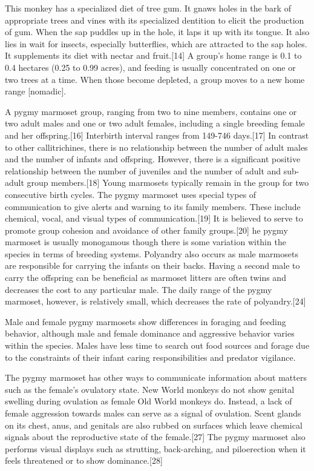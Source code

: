 \documentclass[twoside, 12pt, letterpaper]{report}\usepackage[]{graphicx}\usepackage[]{color}
\begin{document}
\begin{multicols*}{2}
This monkey has a specialized diet of tree gum. It gnaws holes in the bark of appropriate trees and vines with its specialized dentition to elicit the production of gum. When the sap puddles up in the hole, it laps it up with its tongue. It also lies in wait for insects, especially butterflies, which are attracted to the sap holes. It supplements its diet with nectar and fruit.[14] A group's home range is 0.1 to 0.4 hectares (0.25 to 0.99 acres), and feeding is usually concentrated on one or two trees at a time. When those become depleted, a group moves to a new home range [nomadic].

A pygmy marmoset group, ranging from two to nine members, contains one or two adult males and one or two adult females, including a single breeding female and her offspring.[16] Interbirth interval ranges from 149-746 days.[17] In contrast to other callitrichines, there is no relationship between the number of adult males and the number of infants and offspring. However, there is a significant positive relationship between the number of juveniles and the number of adult and sub-adult group members.[18] Young marmosets typically remain in the group for two consecutive birth cycles. The pygmy marmoset uses special types of communication to give alerts and warning to its family members. These include chemical, vocal, and visual types of communication.[19] It is believed to serve to promote group cohesion and avoidance of other family groups.[20] he pygmy marmoset is usually monogamous though there is some variation within the species in terms of breeding systems. Polyandry also occurs as male marmosets are responsible for carrying the infants on their backs. Having a second male to carry the offspring can be beneficial as marmoset litters are often twins and decreases the cost to any particular male. The daily range of the pygmy marmoset, however, is relatively small, which decreases the rate of polyandry.[24]

Male and female pygmy marmosets show differences in foraging and feeding behavior, although male and female dominance and aggressive behavior varies within the species. Males have less time to search out food sources and forage due to the constraints of their infant caring responsibilities and predator vigilance.

The pygmy marmoset has other ways to communicate information about matters such as the female's ovulatory state. New World monkeys do not show genital swelling during ovulation as female Old World monkeys do. Instead, a lack of female aggression towards males can serve as a signal of ovulation. Scent glands on its chest, anus, and genitals are also rubbed on surfaces which leave chemical signals about the reproductive state of the female.[27] The pygmy marmoset also performs visual displays such as strutting, back-arching, and piloerection when it feels threatened or to show dominance.[28]



\end{multicols*}
\end{document}
